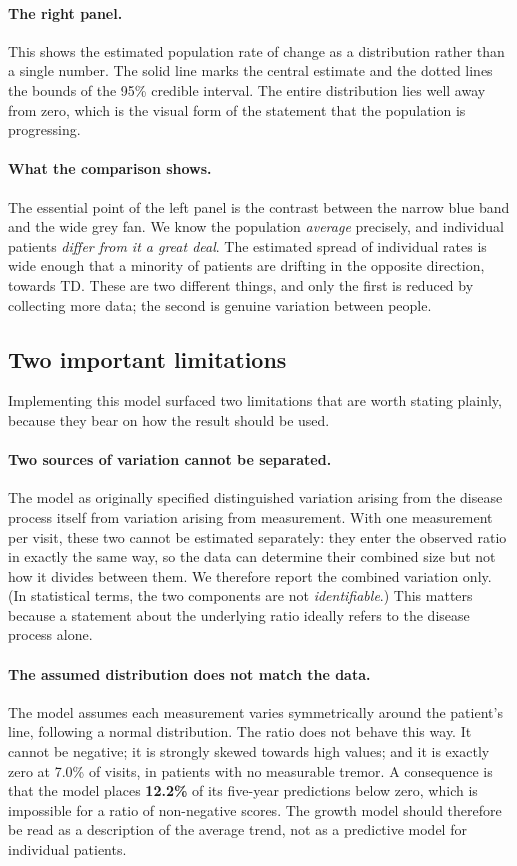 \documentclass[11pt,a4paper]{article}
\begin{document}
\paragraph{The right panel.}
This shows the estimated population rate of change as a distribution rather than
a single number. The solid line marks the central estimate and the dotted lines
the bounds of the 95\% credible interval. The entire distribution lies well away
from zero, which is the visual form of the statement that the population is
progressing.

\paragraph{What the comparison shows.}
The essential point of the left panel is the contrast between the narrow blue
band and the wide grey fan. We know the population \emph{average} precisely, and
individual patients \emph{differ from it a great deal}. The estimated spread of
individual rates is wide enough that a minority of patients are drifting in the
opposite direction, towards TD. These are two different things, and only the
first is reduced by collecting more data; the second is genuine variation
between people.

\subsection{Two important limitations}

Implementing this model surfaced two limitations that are worth stating plainly,
because they bear on how the result should be used.

\paragraph{Two sources of variation cannot be separated.}
The model as originally specified distinguished variation arising from the
disease process itself from variation arising from measurement. With one
measurement per visit, these two cannot be estimated separately: they enter the
observed ratio in exactly the same way, so the data can determine their combined
size but not how it divides between them. We therefore report the combined
variation only. (In statistical terms, the two components are not
\emph{identifiable}.) This matters because a statement about the underlying
ratio ideally refers to the disease process alone.

\paragraph{The assumed distribution does not match the data.}
The model assumes each measurement varies symmetrically around the patient's
line, following a normal distribution. The ratio does not behave this way. It
cannot be negative; it is strongly skewed towards high values; and it is exactly
zero at 7.0\% of visits, in patients with no measurable tremor. A consequence is
that the model places \textbf{12.2\%} of its five-year predictions below zero,
which is impossible for a ratio of non-negative scores. The growth model should
therefore be read as a description of the average trend, not as a predictive
model for individual patients.
\end{document}
